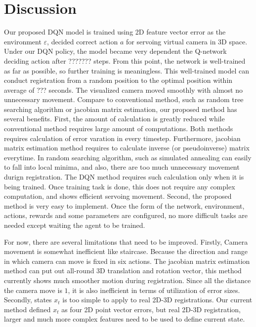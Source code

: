 \documentclass[10pt]{article}
\begin{document}
\section{Discussion}
 Our proposed DQN model is trained using 2D feature vector error as the environment $\varepsilon$, decided correct action $a$ for servoing virtual camera in 3D space. Under our DQN policy, the model became very dependent the Q-network deciding action after ??????? steps. From this point, the network is well-trained as far as possible, so further training is meaningless. This well-trained model can conduct registration from a random position to the optimal position within average of ??? seconds. The visualized camera moved smoothly with almost no unnecessary movement. Compare to conventional method, such as random tree searching algorithm or jacobian matrix estimation, our proposed method has several benefits. First, the amount of calculation is greatly reduced while conventional method requires large amount of computations. Both methods requires calculation of error varation in every timestep. Furthermore, jacobian matrix estimation method requires to calculate inverse (or pseudoinverse) matrix everytime. In random searching algorithm, such as simulated annealing can easily to fall into local minima, and also, there are too much unnecessary movement durign registration. The DQN method requires such calculation only when it is being trained. Once training task is done, this does not require any complex computation, and shows efficient servoing movement. Second, the proposed method is very easy to implement. Once the form of the network, environment, actions, rewards and some parameters are configured, no more difficult tasks are needed except waiting the agent to be trained.

 For now, there are several limitations that need to be improved. Firstly, Camera movement is somewhat inefficient like staircase. Because the direction and range in which camera can move is fixed in six actions. The jacobian matrix estimation method can put out all-round 3D translation and rotation vector, this method currently shows much smoother motion during registration. Since all the distance the camera move is $1$, it is also inefficient in terms of utilization of error sizes. Secondly, states $x_t$ is too simple to apply to real 2D-3D registrations. Our current method defined $x_t$ as four 2D point vector errors, but real 2D-3D registration, larger and much more complex features need to be used to define current state.
\end{document}
